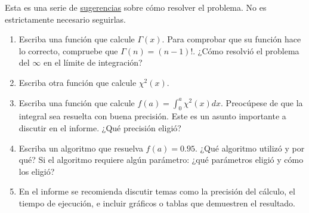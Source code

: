 \documentclass[letter, 11pt]{article}
\begin{document}
\begin{ayuda}
  \small

  Esta es una serie de \underline{sugerencias} sobre cómo resolver el problema.
  No es estrictamente necesario seguirlas.

  \begin{enumerate}
    \item Escriba una función que calcule $\Gamma(x)$. Para comprobar que su
      función hace lo correcto, compruebe que $\Gamma(n) = (n-1)!$. ¿Cómo
      resolvió el problema del $\infty$ en el límite de integración?

    \item Escriba otra función que calcule $\chi^2(x)$.

    \item Escriba una función que calcule $f(a) = \int_0^{a} \chi^2(x) dx $.
      Preocúpese de que la integral sea resuelta con buena precisión. Este es
      un asunto importante a discutir en el informe. ¿Qué precisión eligió?

    \item Escriba un algoritmo que resuelva $f(a) = 0.95$. ¿Qué algoritmo
      utilizó y por qué? Si el algoritmo requiere algún parámetro: ¿qué
      parámetros eligió y cómo los eligió?

    \item En el informe se recomienda discutir temas como la precisión del
      cálculo, el tiempo de ejecución, e incluir gráficos o tablas que
      demuestren el resultado.
  \end{enumerate}

\end{ayuda}
\end{document}
